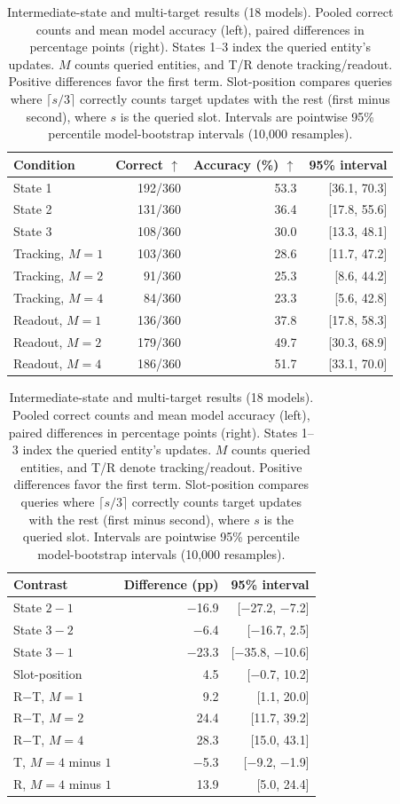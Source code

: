 \begin{table}[t]
\centering
\footnotesize
\setlength{\tabcolsep}{3pt}
\begin{minipage}[t]{0.49\textwidth}
\vspace{0pt}
\centering
\begin{tabular}{@{}lrrr@{}}
\toprule
Condition & Correct $\uparrow$ & Accuracy (\%) $\uparrow$ & 95\% interval \\
\midrule
State 1 & 192/360 & 53.3 & [36.1, 70.3] \\
State 2 & 131/360 & 36.4 & [17.8, 55.6] \\
State 3 & 108/360 & 30.0 & [13.3, 48.1] \\
\addlinespace[2pt]
Tracking, $M=1$ & 103/360 & 28.6 & [11.7, 47.2] \\
Tracking, $M=2$ & 91/360 & 25.3 & [8.6, 44.2] \\
Tracking, $M=4$ & 84/360 & 23.3 & [5.6, 42.8] \\
\addlinespace[2pt]
Readout, $M=1$ & 136/360 & 37.8 & [17.8, 58.3] \\
Readout, $M=2$ & 179/360 & 49.7 & [30.3, 68.9] \\
Readout, $M=4$ & 186/360 & 51.7 & [33.1, 70.0] \\
\bottomrule
\end{tabular}
\end{minipage}\hfill
\begin{minipage}[t]{0.49\textwidth}
\vspace{0pt}
\centering
\begin{tabular}{@{}lrr@{}}
\toprule
Contrast & Difference (pp) & 95\% interval \\
\midrule
State $2-1$ & $-$16.9 & [$-$27.2, $-$7.2] \\
State $3-2$ & $-$6.4 & [$-$16.7, 2.5] \\
State $3-1$ & $-$23.3 & [$-$35.8, $-$10.6] \\
Slot-position & 4.5 & [$-$0.7, 10.2] \\
\addlinespace[2pt]
R$-$T, $M=1$ & 9.2 & [1.1, 20.0] \\
R$-$T, $M=2$ & 24.4 & [11.7, 39.2] \\
R$-$T, $M=4$ & 28.3 & [15.0, 43.1] \\
\addlinespace[2pt]
T, $M=4$ minus $1$ & $-$5.3 & [$-$9.2, $-$1.9] \\
R, $M=4$ minus $1$ & 13.9 & [5.0, 24.4] \\
\bottomrule
\end{tabular}
\end{minipage}
\caption{Intermediate-state and multi-target results (18 models). Pooled correct counts and mean model accuracy (left), paired differences in percentage points (right). States 1--3 index the queried entity's updates. $M$ counts queried entities, and T/R denote tracking/readout. Positive differences favor the first term. Slot-position compares queries where $\lceil s/3\rceil$ correctly counts target updates with the rest (first minus second), where $s$ is the queried slot. Intervals are pointwise 95\% percentile model-bootstrap intervals (10,000 resamples).}
\label{tab:ext-summary}
\end{table}
